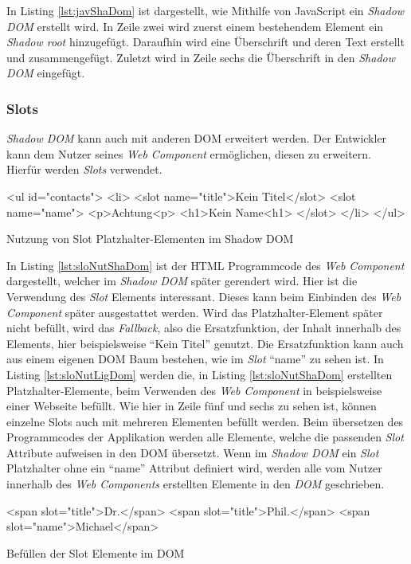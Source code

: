 \documentclass[12pt, paper=a4, bibtotoc, toc=listof, headsepline=true]{scrreprt}
\begin{document}
		In Listing \ref{lst:javShaDom} ist dargestellt, wie Mithilfe von JavaScript ein \emph{Shadow \ac{DOM}} erstellt wird. In Zeile zwei wird zuerst einem bestehendem Element ein \emph{Shadow root} hinzugefügt. Daraufhin wird eine Überschrift und deren Text erstellt und zusammengefügt. Zuletzt wird in Zeile sechs die Überschrift in den \emph{Shadow \ac{DOM}} eingefügt.
			\subsubsection{Slots}
			\emph{Shadow \ac{DOM}} kann auch mit anderen \ac{DOM} erweitert werden. Der Entwickler kann dem Nutzer seines \emph{Web Component} ermöglichen, diesen zu erweitern. Hierfür werden \emph{Slots} verwendet. 
			\begin{listing}
				\begin{HTMLcode*}{}
<ul id="contacts">
   <li>
      <slot name="title">Kein Titel</slot>
      <slot name="name">
         <p>Achtung<p>
         <h1>Kein Name<h1>
      </slot>
   </li>
</ul>
				\end{HTMLcode*}
				\caption{Nutzung von Slot Platzhalter-Elementen im Shadow DOM}
				\label{lst:sloNutShaDom}
			\end{listing}
			In Listing \ref{lst:sloNutShaDom} ist der \ac{HTML} Programmcode des \emph{Web Component} dargestellt, welcher im \emph{Shadow \ac{DOM}} später gerendert wird. Hier ist die Verwendung des \emph{Slot} Elements interessant. Dieses kann beim Einbinden des \emph{Web Component} später ausgestattet werden. Wird das Platzhalter-Element später nicht befüllt, wird das \emph{Fallback}, also die Ersatzfunktion, der Inhalt innerhalb des Elements, hier beispielsweise \enquote{Kein Titel} genutzt. Die Ersatzfunktion kann auch aus einem eigenen \ac{DOM} Baum bestehen, wie im \emph{Slot} \enquote{name} zu sehen ist.\cite[vgl.]{Bidelman2016} In Listing \ref{lst:sloNutLigDom} werden die, in Listing \ref{lst:sloNutShaDom} erstellten Platzhalter-Elemente, beim Verwenden des \emph{Web Component} in beispielsweise einer Webseite befüllt. Wie hier in Zeile fünf und sechs zu sehen ist, können einzelne Slots auch mit mehreren Elementen befüllt werden. Beim übersetzen des Programmcodes der Applikation werden alle Elemente, welche die passenden \emph{Slot} Attribute aufweisen in den \ac{DOM} übersetzt. Wenn im \emph{Shadow \ac{DOM}} ein \emph{Slot} Platzhalter ohne ein \enquote{name} Attribut definiert wird, werden alle vom Nutzer innerhalb des \emph{Web Components} erstellten Elemente in den \emph{DOM} geschrieben.
			\begin{listing}
				\begin{HTMLcode*}{}
<span slot="title">Dr.</span>
<span slot="title">Phil.</span>
<span slot="name">Michael</span>
				\end{HTMLcode*}
				\caption{Befüllen der Slot Elemente im DOM}
				\label{lst:sloNutLigDom}
			\end{listing}
\end{document}
